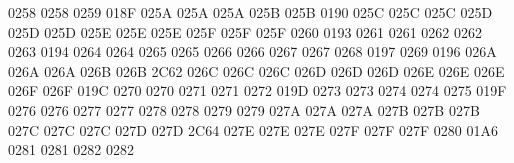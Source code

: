  0258 0258 %
 0259 018F %
\setcclcucx 025A 025A 025A %
\setcclcucx 025B 025B 0190 %
\setcclcucx 025C 025C 025C %
\setcclcucx 025D 025D 025D %
\setcclcucx 025E 025E 025E %
\setcclcucx 025F 025F 025F %
 0260 0193 %
 0261 0261 %
 0262 0262 %
 0263 0194 %
 0264 0264 %
 0265 0265 %
 0266 0266 %
 0267 0267 %
 0268 0197 %
 0269 0196 %
\setcclcucx 026A 026A 026A %
\setcclcucx 026B 026B 2C62 %
\setcclcucx 026C 026C 026C %
\setcclcucx 026D 026D 026D %
\setcclcucx 026E 026E 026E %
\setcclcucx 026F 026F 019C %
 0270 0270 %
 0271 0271 %
 0272 019D %
 0273 0273 %
 0274 0274 %
 0275 019F %
 0276 0276 %
 0277 0277 %
 0278 0278 %
 0279 0279 %
\setcclcucx 027A 027A 027A %
\setcclcucx 027B 027B 027B %
\setcclcucx 027C 027C 027C %
\setcclcucx 027D 027D 2C64 %
\setcclcucx 027E 027E 027E %
\setcclcucx 027F 027F 027F %
 0280 01A6 %
 0281 0281 %
 0282 0282 %
